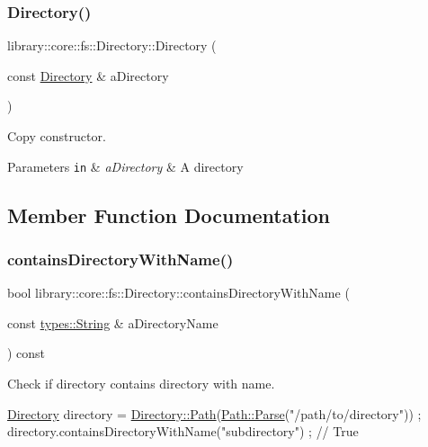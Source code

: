 \subsubsection{\texorpdfstring{Directory()}{Directory()}\hspace{0.1cm}{\footnotesize\ttfamily [2/2]}}
{\footnotesize\ttfamily library\+::core\+::fs\+::\+Directory\+::\+Directory (\begin{DoxyParamCaption}\item[{const \hyperlink{classlibrary_1_1core_1_1fs_1_1_directory}{Directory} \&}]{a\+Directory }\end{DoxyParamCaption})}



Copy constructor. 


\begin{DoxyParams}[1]{Parameters}
\mbox{\tt in}  & {\em a\+Directory} & A directory \\
\hline
\end{DoxyParams}


\subsection{Member Function Documentation}
\mbox{\label{classlibrary_1_1core_1_1fs_1_1_directory_abf702bc8f107d3e4eefe15579861b8e3}} 
\subsubsection{\texorpdfstring{contains\+Directory\+With\+Name()}{containsDirectoryWithName()}}
{\footnotesize\ttfamily bool library\+::core\+::fs\+::\+Directory\+::contains\+Directory\+With\+Name (\begin{DoxyParamCaption}\item[{const \hyperlink{classlibrary_1_1core_1_1types_1_1_string}{types\+::\+String} \&}]{a\+Directory\+Name }\end{DoxyParamCaption}) const}



Check if directory contains directory with name. 


\begin{DoxyCode}
\hyperlink{classlibrary_1_1core_1_1fs_1_1_directory_a3ec39f6cad19a81d520e9a1f2d8bb1f7}{Directory} directory = \hyperlink{classlibrary_1_1core_1_1fs_1_1_directory_a6d3ea04654841e62a4dbd99feb563caf}{Directory::Path}(\hyperlink{classlibrary_1_1core_1_1fs_1_1_path_a6ba644b6609507e724c217bf2020f5ae}{Path::Parse}(\textcolor{stringliteral}{"/path/to/directory"}))
       ;
directory.containsDirectoryWithName(\textcolor{stringliteral}{"subdirectory"}) ; \textcolor{comment}{// True}
\end{DoxyCode}


